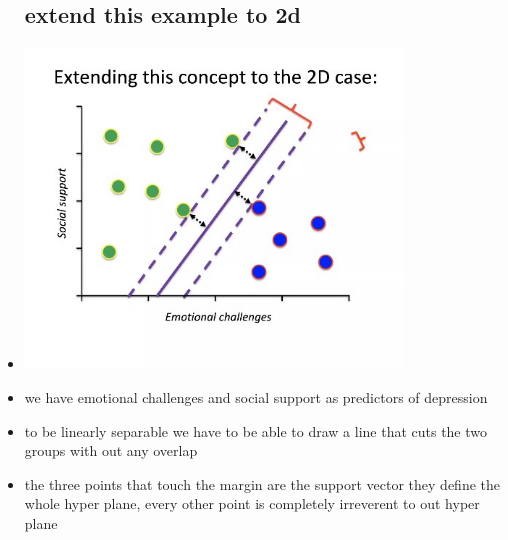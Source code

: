 \documentclass{article}
\begin{document}
\begin{itemize}
\subsection{extend this example to 2d}
\item \includegraphics[width=10cm]{Final_Review/lecture_10/2dmargin.jpg}

\item we have emotional challenges and social support as predictors of depression 
\item to be linearly separable we have to be able to draw a line that cuts the two groups with out any overlap
\item the three points that touch the margin are the support vector they define the whole hyper plane, every other point is completely irreverent to out hyper plane  

\end{itemize}
\end{document}
